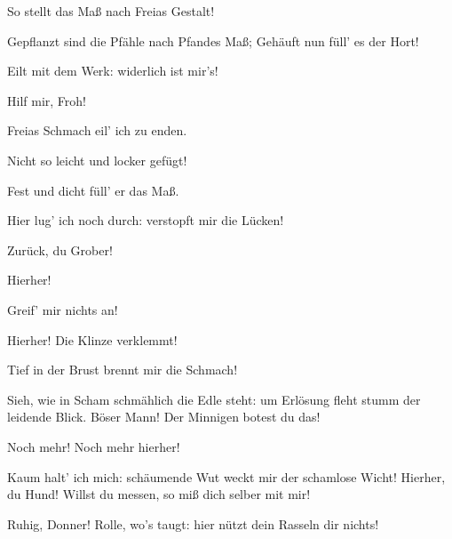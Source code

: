 \begin{drama}
\Wotanspeaks
So stellt das Maß nach Freias Gestalt!
 




\Fafnerspeaks
Gepflanzt sind die Pfähle nach Pfandes Maß;
Gehäuft nun füll' es der Hort!
 

\Wotanspeaks
Eilt mit dem Werk: widerlich ist mir's!
 

\Logespeaks
Hilf mir, Froh!
 

\Frohspeaks
Freias Schmach eil' ich zu enden.
 




\Fafnerspeaks
Nicht so leicht und locker gefügt!
 



Fest und dicht füll' er das Maß.
 



Hier lug' ich noch durch:
verstopft mir die Lücken!
 

\Logespeaks
Zurück, du Grober!
 

\Fafnerspeaks
Hierher!
 

\Logespeaks
Greif' mir nichts an!
 

\Fafnerspeaks
Hierher! Die Klinze verklemmt!
 

\Wotanspeaks


Tief in der Brust brennt mir die Schmach!
 

\Frickaspeaks


Sieh, wie in Scham schmählich die Edle steht:
um Erlösung fleht stumm der leidende Blick.
Böser Mann! Der Minnigen botest du das!
 

\Fafnerspeaks
Noch mehr! Noch mehr hierher!
 

\Donnerspeaks
Kaum halt' ich mich: schäumende Wut
weckt mir der schamlose Wicht!
Hierher, du Hund! Willst du messen,
so miß dich selber mit mir!
 

\Fafnerspeaks
Ruhig, Donner! Rolle, wo's taugt:
hier nützt dein Rasseln dir nichts!
 


\end{drama}
